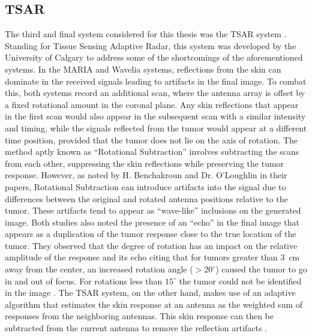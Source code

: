 \subsection{TSAR}
The third and final system considered for this thesis was the TSAR system \cite{e.c.fearMicrowaveBreastImaging2013}.
Standing for Tissue Sensing Adaptive Radar, this system was developed by the University of Calgary to address some of
the shortcomings of the aforementioned systems. In the MARIA and Wavelia systems, reflections from the skin can dominate
in the received signals leading to artifacts in the final image. To combat this, both systems record an additional scan,
where the antenna array is offset by a fixed rotational amount in the coronal plane. Any skin reflections that appear in
the first scan would also appear in the subsequent scan with a similar intensity and timing, while the signals reflected
from the tumor would appear at a different time position, provided that the tumor does not lie on the axis of rotation.
The method aptly known as ``Rotational Subtraction'' involves subtracting the scans from each other, suppressing the skin
reflections while preserving the tumor response. However, as noted by H. Benchakroun and Dr. O'Loughlin in their
papers, Rotational Subtraction can introduce artifacts into the signal due to differences between the original and
rotated antenna positions relative to the tumor. These artifacts tend to appear as ``wave-like'' inclusions on the
generated image. Both studies also noted the presence of an ``echo'' in the final image that appears as a duplication of
the tumor response close to the true location of the tumor. They observed that the degree of rotation has an impact on
the relative amplitude of the response and its echo citing that for tumors greater than $3$~cm away from the center, an
increased rotation angle ($ > 20^{\circ}$) caused the tumor to go in and out of focus. For rotations less than
$15^{\circ}$ the tumor could not be identified in the image \cite{h.benchakrounImpactRotationalArtefact2021,
d.oloughlinRotationalArtefactRemoval2020}. The TSAR system, on the other hand, makes use of an adaptive
algorithm that estimates the skin response at an antenna as the weighted sum of responses from the
neighboring antennas. This skin response can then be subtracted from the current antenna to remove the reflection
artifacts \cite{makladNeighborhoodBasedAlgorithmFacilitate2012}. \hfill \break

